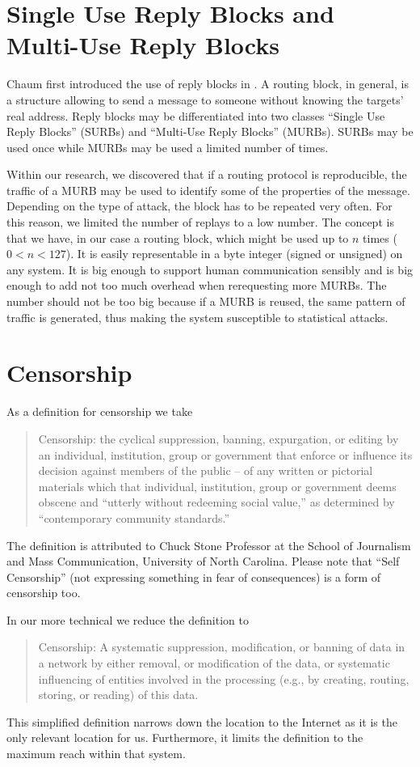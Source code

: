 \section{Single Use Reply Blocks and Multi-Use Reply Blocks}
Chaum first introduced the use of reply blocks in \cite{CHAUM1}. A routing block, in general, is a structure allowing to send a message to someone without knowing the targets' real address. Reply blocks may be differentiated into two classes ``Single Use Reply Blocks'' (SURBs)  and ``Multi-Use Reply Blocks'' (MURBs). SURBs may be used once while MURBs may be used a limited number of times. 

Within our research, we discovered that if a routing protocol is reproducible, the traffic of a MURB may be used to identify some of the properties of the message. Depending on the type of attack, the block has to be repeated very often. For this reason, we limited the number of replays to a low number. The concept is that we have, in our case a routing block, which might be used up to $n$ times ($0<n<127$). It is easily representable in a byte integer (signed or unsigned) on any system. It is big enough to support human communication sensibly and is big enough to add not too much overhead when rerequesting more MURBs. The number should not be too big because if a MURB is reused, the same pattern of traffic is generated, thus making the system susceptible to statistical attacks.

\section{Censorship}
As a definition for censorship we take
\begin{quote}
	Censorship: the cyclical suppression, banning, expurgation, or editing by an individual, institution, group or government that enforce or influence its decision against members of the public -- of any written or pictorial materials which that individual, institution, group or government deems obscene and ``utterly without redeeming social value,'' as determined by ``contemporary community standards.''
\end{quote}

The definition is attributed to Chuck Stone Professor at the School of Journalism and Mass Communication, University of North Carolina. Please note that ``Self Censorship'' (not expressing something in fear of consequences) is a form of censorship too.

In our more technical we reduce the definition to
\begin{quote}
	Censorship: A systematic suppression, modification, or banning of data in a network by either removal, or modification of the data, or systematic influencing of entities involved in the processing (e.g., by creating, routing, storing, or reading) of this data.
\end{quote}
This simplified definition narrows down the location to the Internet as it is the only relevant location for us.  Furthermore, it limits the definition to the maximum reach within that system.

